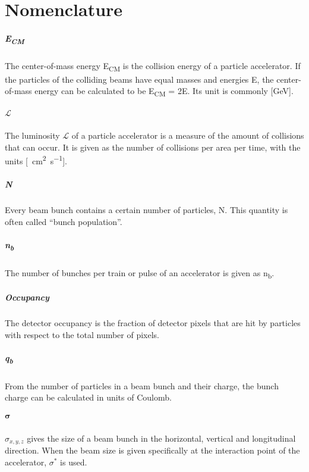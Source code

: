 \chapter*{Nomenclature} 
\paragraph{E\textsubscript{CM}}
The center-of-mass energy E\textsubscript{CM} is the collision energy of a particle accelerator.
If the particles of the colliding beams have equal masses and energies E, the center-of-mass energy can be calculated to be E\textsubscript{CM} = 2E. Its unit is commonly [\si{\GeV}].
\paragraph{$\bm{\mathcal{L}}$}
The luminosity $\mathcal{L}$ of a particle accelerator is a measure of the amount of collisions that can occur. It is given as the number of collisions per area per time, with the units [\si{\per\centi\meter\squared\per\second}].
\paragraph{N}
Every beam bunch contains a certain number of particles, N. This quantity is often called ``bunch population''.
\paragraph{n\textsubscript{b}}
The number of bunches per train or pulse of an accelerator is given as n\textsubscript{b}.
\paragraph{Occupancy}
The detector occupancy is the fraction of detector pixels that are hit by particles with respect to the total number of pixels.
\paragraph{q\textsubscript{b}}
From the number of particles in a beam bunch and their charge, the bunch charge can be calculated in units of Coulomb.
\paragraph{$\bm\sigma$}
$\sigma_{x,y,z}$ gives the size of a beam bunch in the horizontal, vertical and longitudinal direction. When the beam size is given specifically at the interaction point of the accelerator, $\sigma^*$ is used.
